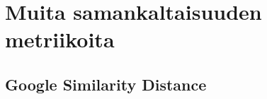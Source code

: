 \documentclass[11pt,finnish]{tktltiki2}
\theoremstyle{definition}
\theoremstyle{remark}
\begin{document}
\section{Muita samankaltaisuuden metriikoita} %
\label{sec:muita_samankaltaisuuden_metriikoita}
  \subsection{Google Similarity Distance} %
  \label{sub:google_similarity_distance}

%
%

%

% 





%
\end{document}
